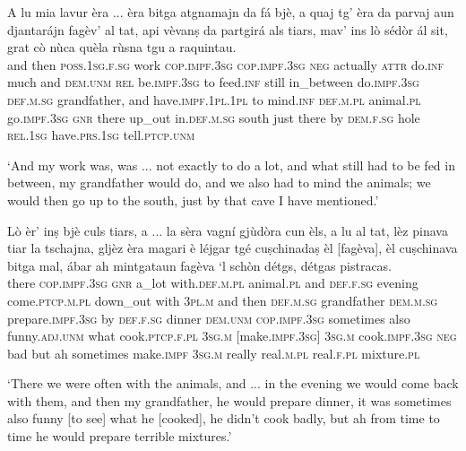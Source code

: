 \begin{linenumbers}
\gll A lu mia lavur èra ... èra bitga atgnamajn da fá bjè, a quaj tg’ èra da parvaj aun djantarájn fagèv’ al tat, api vèvanṣ da partgirá als tiars, mav’ ins lò sédòr ál sit, grat cò nùca quèla rùsna tgu a raquintau.\\
and then \textsc{poss.1sg.f.sg} work \textsc{cop.impf.3sg} {} \textsc{cop.impf.3sg} \textsc{neg} actually \textsc{attr} do.\textsc{inf} much and \textsc{dem.unm} \textsc{rel} be.\textsc{impf.3sg} to feed.\textsc{inf} still in\_between do.\textsc{impf.3sg} \textsc{def.m.sg} grandfather, and have.\textsc{impf.1pl.1pl} to mind.\textsc{inf} \textsc{def.m.pl} animal.\textsc{pl} go.\textsc{impf.3sg} \textsc{gnr} there up\_out in.\textsc{def.m.sg} south just there by \textsc{dem.f.sg} hole \textsc{rel.1sg} have.\textsc{prs.1sg} tell.\textsc{ptcp.unm}\\  
\end{linenumbers}
\medskip
\glt `And my work was, was ... not exactly to do a lot, and what still had to be fed in between, my grandfather would do, and we also had to mind the animals; we would then go up to the south, just by that cave I have mentioned.'
\medskip

\begin{linenumbers}
\gll  Lò èr’ inṣ bjè culs tiars, a ... la sèra vagní gjùdòra cun èls, a lu al tat, lèz pinava tiar la tschajna, gljèz èra magari è léjgar tgé cuṣchinadaṣ èl [fagèva], èl cuṣchinava bitga mal, ábar ah mintgataun fagèva `l schòn détgs, détgas pistracas.\\
there \textsc{cop.impf.3sg} \textsc{gnr} a\_lot  with.\textsc{def.m.pl} animal.\textsc{pl} and {} \textsc{def.f.sg} evening  come.\textsc{ptcp.m.pl} down\_out with \textsc{3pl.m} and then \textsc{def.m.sg} grandfather \textsc{dem.m.sg} prepare.\textsc{impf.3sg} by \textsc{def.f.sg} dinner \textsc{dem.unm} \textsc{cop.impf.3sg} sometimes also funny.\textsc{adj.unm} what cook.\textsc{ptcp.f.pl} \textsc{3sg.m} [make.\textsc{impf.3sg}] \textsc{3sg.m} cook.\textsc{impf.3sg} \textsc{neg} bad but ah sometimes make.\textsc{impf} \textsc{3sg.m} really real.\textsc{m.pl} real.\textsc{f.pl} mixture.\textsc{pl}\\
\end{linenumbers}
\medskip
\glt `There we were often with the animals, and ... in the evening we would come back with them, and then my grandfather, he would prepare dinner, it was sometimes also funny [to see] what he [cooked], he didn’t cook badly, but ah from time to time he would prepare terrible mixtures.'
\medskip

